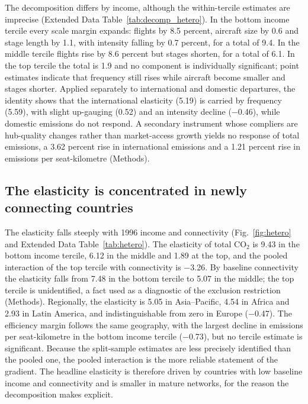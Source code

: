 \documentclass[12pt]{extarticle}
\begin{document}
The decomposition differs by income, although the within-tercile
estimates are imprecise (Extended Data Table~\ref{tab:decomp_hetero}). In
the bottom income tercile every scale margin expands: flights by 8.5
percent, aircraft size by 0.6 and stage length by 1.1, with intensity
falling by 0.7 percent, for a total of 9.4. In the middle tercile flights
rise by 8.6 percent but stages shorten, for a total of 6.1. In the top
tercile the total is 1.9 and no component is individually significant;
point estimates indicate that frequency still rises while aircraft become
smaller and stages shorter. Applied separately to international and
domestic departures, the identity shows that the international elasticity
(5.19) is carried by frequency (5.59), with slight up-gauging (0.52) and an
intensity decline ($-$0.46), while domestic emissions do not respond. A
secondary instrument whose compliers are hub-quality changes rather than
market-access growth yields no response of total emissions, a 3.62 percent
rise in international emissions and a 1.21 percent rise in emissions per
seat-kilometre (Methods).

\subsection*{The elasticity is concentrated in newly connecting countries}
The elasticity falls steeply with 1996 income and connectivity
(Fig.~\ref{fig:hetero} and Extended Data Table~\ref{tab:hetero}). The
elasticity of total CO$_2$ is 9.43 in the bottom income tercile, 6.12 in
the middle and 1.89 at the top, and the pooled interaction of the top
tercile with connectivity is $-$3.26. By baseline connectivity the
elasticity falls from 7.48 in the bottom tercile to 5.07 in the middle;
the top tercile is unidentified, a fact used as a diagnostic of the
exclusion restriction (Methods). Regionally, the elasticity is 5.05 in
Asia--Pacific, 4.54 in Africa and 2.93 in Latin America, and
indistinguishable from zero in Europe ($-$0.47). The efficiency margin
follows the same geography, with the largest decline in emissions per
seat-kilometre in the bottom income tercile ($-$0.73), but no tercile
estimate is significant. Because the split-sample estimates are less
precisely identified than the pooled one, the pooled interaction is the
more reliable statement of the gradient. The headline elasticity is
therefore driven by countries with low baseline income and connectivity
and is smaller in mature networks, for the reason the decomposition makes
explicit.
\end{document}
